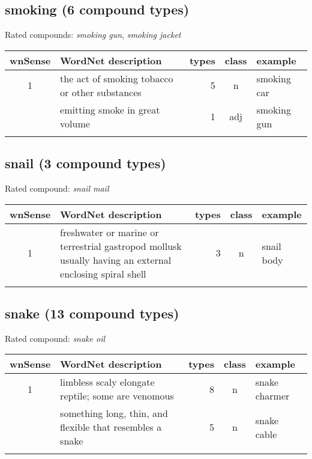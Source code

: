 \subsection{smoking      (6 compound types)}
Rated compounds: \emph{smoking gun}, \emph{smoking jacket}

\vspace*{1ex}

\noindent
\begin{longtable}{c>{\raggedright\arraybackslash}p{5cm}rc>{\raggedright\arraybackslash}p{2cm}}\lsptoprule
{\small wnSense}&WordNet description&types&class&example\\\midrule
1&the act of smoking tobacco or other substances&5&n&smoking car\\\tablevspace
5&emitting smoke in great volume&1&adj&smoking gun\\\lspbottomrule
\end{longtable}

\subsection{snail        (3 compound types)}
Rated compound: \emph{snail mail}


\noindent
\begin{longtable}{c>{\raggedright\arraybackslash}p{5cm}rc>{\raggedright\arraybackslash}p{2cm}}\lsptoprule
{\small wnSense}&WordNet description&types&class&example\\\midrule
1&freshwater or marine or terrestrial gastropod mollusk usually having an external enclosing spiral shell&3&n&snail body\\\lspbottomrule
\end{longtable}

\subsection{snake        (13 compound types)}
Rated compound: \emph{snake oil}


\noindent
\begin{longtable}{c>{\raggedright\arraybackslash}p{5cm}rc>{\raggedright\arraybackslash}p{2cm}}\lsptoprule
{\small wnSense}&WordNet description&types&class&example\\\midrule
1&limbless scaly elongate reptile; some are venomous&8&n&snake charmer\\\tablevspace
5&something long, thin, and flexible that resembles a snake&5&n&snake cable\\\lspbottomrule
\end{longtable}

